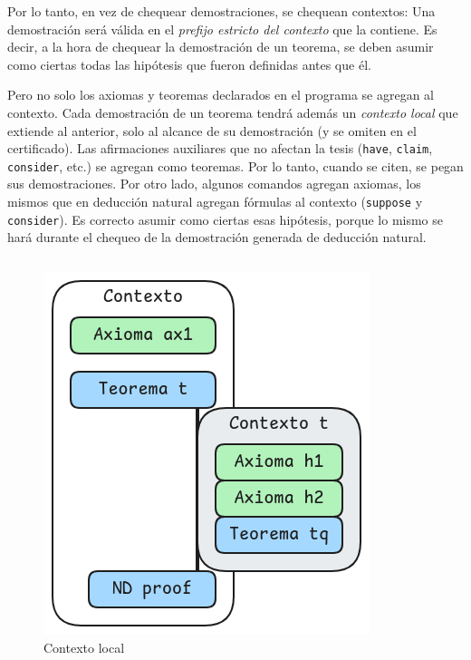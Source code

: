 Por lo tanto, en vez de chequear demostraciones, se chequean contextos: Una
demostración será válida en el \textit{prefijo estricto del contexto} que la
contiene. Es decir, a la hora de chequear la demostración de un teorema, se
deben asumir como ciertas todas las hipótesis que fueron definidas antes que él.

Pero no solo los axiomas y teoremas declarados en el programa se agregan al
contexto. Cada demostración de un teorema tendrá además un \textit{contexto
local} que extiende al anterior, solo al alcance de su demostración (y se omiten
en el certificado). Las afirmaciones auxiliares que no afectan la tesis
(\lstinline{have}, \lstinline{claim}, \lstinline{consider}, etc.) se agregan
como teoremas. Por lo tanto, cuando se citen, se pegan sus demostraciones. Por
otro lado, algunos comandos agregan axiomas, los mismos que en deducción natural
agregan fórmulas al contexto (\lstinline{suppose} y \lstinline{consider}). Es
correcto asumir como ciertas esas hipótesis, porque lo mismo se hará durante el
chequeo de la demostración generada de deducción natural.

\begin{figure}[H]
    \centering
    \begin{multicols}{2}
        \begin{tabular}{c}
            
        \end{tabular}
        \includegraphics[scale=0.5]{img/ppa-local-context.png}
    \end{multicols}
    \caption{Contexto local}
\end{figure}

